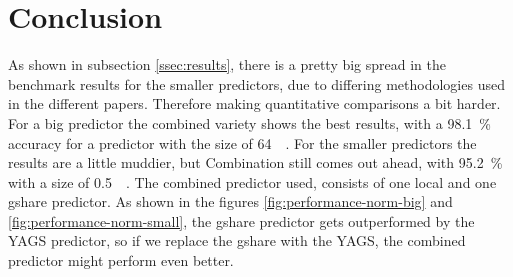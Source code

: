 \section{Conclusion}
\label{sec:conclusion}
As shown in subsection \ref{ssec:results}, there is a pretty big spread in the benchmark results for the smaller predictors, due to differing methodologies used in the different papers.
Therefore making quantitative comparisons a bit harder.
For a big predictor the combined variety shows the best results, with a \SI{98.1}{\percent} accuracy for a predictor with the size of \SI{64}{\kilo\byte}.
For the smaller predictors the results are a little muddier, but Combination still comes out ahead, with \SI{95.2}{\percent} with a size of \SI{0.5}{\kilo\byte}.
The combined predictor used, consists of one local and one gshare predictor.
As shown in the figures \ref{fig:performance-norm-big} and \ref{fig:performance-norm-small}, the gshare predictor gets outperformed by the YAGS predictor, so if we replace the gshare with the YAGS, the combined predictor might perform even better.